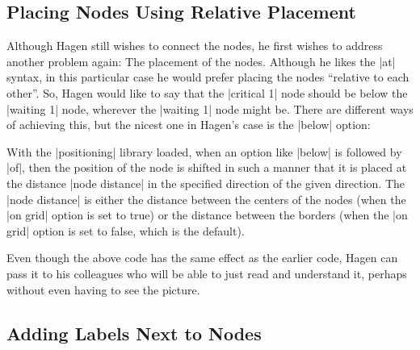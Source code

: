 \subsection{Placing Nodes Using Relative Placement}

Although Hagen still wishes to connect the nodes, he first wishes to address
another problem again: The placement of the nodes. Although he likes the |at|
syntax, in this particular case he would prefer placing the nodes ``relative to
each other''. So, Hagen would like to say that the |critical 1| node should be
below the |waiting 1| node, wherever the |waiting 1| node might be. There are
different ways of achieving this, but the nicest one in Hagen's case is the
|below| option:
%
\begin{codeexample}[preamble={\usetikzlibrary{positioning}}]
\end{codeexample}

With the |positioning| library loaded, when an option like |below| is followed
by |of|, then the position of the node is shifted in such a manner that it is
placed at the distance |node distance| in the specified direction of the given
direction. The |node distance| is either the distance between the centers of
the nodes (when the |on grid| option is set to true) or the distance between
the borders (when the |on grid| option is set to false, which is the default).

Even though the above code has the same effect as the earlier code, Hagen can
pass it to his colleagues who will be able to just read and understand it,
perhaps without even having to see the picture.


\subsection{Adding Labels Next to Nodes}

